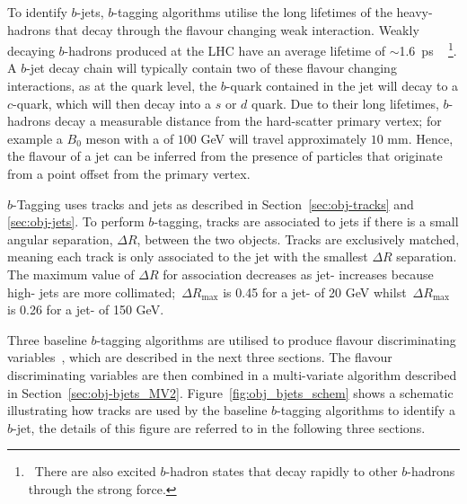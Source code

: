 To identify $b$-jets, $b$-tagging algorithms utilise the long lifetimes of the heavy-hadrons that decay through the flavour changing weak interaction.
Weakly decaying $b$-hadrons produced at the LHC have an average lifetime of $\sim$\SI{1.6}{\pico\second} ~\cite{obj-bjets_PDG}
 \footnote{\ There are also excited $b$-hadron states that decay rapidly to other $b$-hadrons through the strong force.}.
A $b$-jet decay chain  will typically contain two of these flavour changing interactions, 
as at the quark level, the $b$-quark contained in the jet will decay to a $c$-quark, which will then decay into a $s$ or $d$ quark.
Due to their long lifetimes, $b$-hadrons decay a measurable distance from the hard-scatter primary vertex;
for example a $B_0$ meson with a \pT{} of $100$ GeV will travel approximately $10$ mm.
Hence, the flavour of a jet can be inferred from the presence of particles
that originate from a point offset from the primary vertex.

$b$-Tagging uses tracks and jets as described in Section~\ref{sec:obj-tracks} and \ref{sec:obj-jets}.
To perform $b$-tagging, tracks are associated to jets if there is a small angular separation, $\Delta R$, between the two objects.
Tracks are exclusively matched, meaning each track is only associated to the jet with the smallest $\Delta R$ separation.
The maximum value of $\Delta R$ for association decreases as jet-\pT{} increases because high-\pT{} jets are more collimated;
$\,\Delta R_{\text{max}}$ is 0.45 for a jet-\pT{} of 20 GeV whilst $\,\Delta R_{\text{max}}$ is 0.26 for a jet-\pT{} of 150 GeV.

Three baseline $b$-tagging algorithms are utilised to produce flavour discriminating variables~\cite{obj-bjets_algo_2016}, which are described in the next three sections.
The flavour discriminating variables are then combined in a multi-variate algorithm described in Section~\ref{sec:obj-bjets_MV2}.
Figure~\ref{fig:obj_bjets_schem} shows a schematic illustrating how tracks
are used by the baseline $b$-tagging algorithms to identify a $b$-jet,
the details of this figure are referred to in the following three sections.

